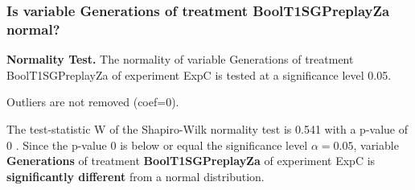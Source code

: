 \begin{frame}[t]
 \frametitle{Is variable Generations of treatment BoolT1SGPreplayZa normal?}
 {\bf Normality Test.} The normality of variable Generations of treatment BoolT1SGPreplayZa of experiment ExpC is tested at a significance level 0.05.

 Outliers are not removed (coef=0).
 
 The test-statistic W of the Shapiro-Wilk normality test is 0.541 with a p-value of 0 .
 Since the p-value 0 is below or equal the significance level $\alpha= 0.05 $,
 variable {\bf  Generations } of treatment {\bf  BoolT1SGPreplayZa } of experiment ExpC  is {\bf significantly different} from a normal distribution.

 \end{frame}
